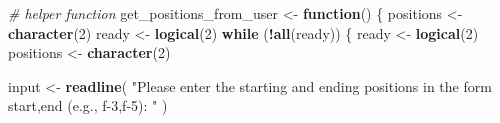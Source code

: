 \documentclass[
]{article}
\newenvironment{Shaded}{\begin{snugshade}}{\end{snugshade}}
\newcommand{\CommentTok}[1]{\textcolor[rgb]{0.56,0.35,0.01}{\textit{#1}}}
\newcommand{\ControlFlowTok}[1]{\textcolor[rgb]{0.13,0.29,0.53}{\textbf{#1}}}
\newcommand{\DecValTok}[1]{\textcolor[rgb]{0.00,0.00,0.81}{#1}}
\newcommand{\FunctionTok}[1]{\textcolor[rgb]{0.13,0.29,0.53}{\textbf{#1}}}
\newcommand{\NormalTok}[1]{#1}
\newcommand{\OtherTok}[1]{\textcolor[rgb]{0.56,0.35,0.01}{#1}}
\newcommand{\SpecialCharTok}[1]{\textcolor[rgb]{0.81,0.36,0.00}{\textbf{#1}}}
\newcommand{\StringTok}[1]{\textcolor[rgb]{0.31,0.60,0.02}{#1}}
\begin{document}
\begin{Shaded}
\begin{Highlighting}[]
  \CommentTok{\# helper function}
\NormalTok{  get\_positions\_from\_user }\OtherTok{\textless{}{-}} \ControlFlowTok{function}\NormalTok{() \{}
\NormalTok{    positions }\OtherTok{\textless{}{-}} \FunctionTok{character}\NormalTok{(}\DecValTok{2}\NormalTok{)}
\NormalTok{    ready }\OtherTok{\textless{}{-}} \FunctionTok{logical}\NormalTok{(}\DecValTok{2}\NormalTok{)}
    \ControlFlowTok{while}\NormalTok{ (}\SpecialCharTok{!}\FunctionTok{all}\NormalTok{(ready)) \{}
\NormalTok{      ready }\OtherTok{\textless{}{-}} \FunctionTok{logical}\NormalTok{(}\DecValTok{2}\NormalTok{)}
\NormalTok{      positions }\OtherTok{\textless{}{-}} \FunctionTok{character}\NormalTok{(}\DecValTok{2}\NormalTok{)}
      
\NormalTok{      input }\OtherTok{\textless{}{-}}
        \FunctionTok{readline}\NormalTok{(}
          \StringTok{"Please enter the starting and ending positions in the form \textquotesingle{}start,end\textquotesingle{} (e.g., \textquotesingle{}f{-}3,f{-}5\textquotesingle{}): "}
\NormalTok{        )}
      

\end{Highlighting}
\end{Shaded}
\end{document}
